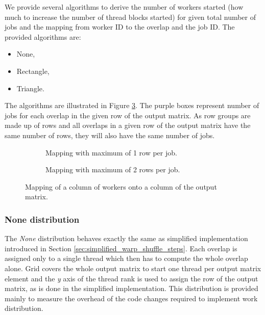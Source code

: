 We provide several algorithms to derive the number of workers started (how much to increase the number of thread blocks started) for given total number of jobs and the mapping from worker ID to the overlap and the job ID. The provided algorithms are:

\begin{itemize}
	\item None,
	\item Rectangle,
	\item Triangle.
\end{itemize}


The algorithms are illustrated in Figure \ref{fig:work_distribution_examples}. The purple boxes represent number of jobs for each overlap in the given row of the output matrix. As row groups are made up of rows and all overlaps in a given row of the output matrix have the same number of rows, they will also have the same number of jobs.

\begin{figure}[ht]
	\centering	
	\begin{subfigure}{0.7\textwidth}
	\centering
		\def\svgwidth{\textwidth}
		\fontsize{6}{8}\selectfont
		
		\caption{Mapping with maximum of 1 row per job.}
		\label{fig:work_dist_max_1}
	\end{subfigure}
	\hfill
	\begin{subfigure}{0.6\textwidth}
 		\centering
		\def\svgwidth{\textwidth}
		\fontsize{6}{8}\selectfont
		
		\caption{Mapping with maximum of 2 rows per job.}
		\label{fig:work_dist_max_2}
	\end{subfigure}
	
	\caption{Mapping of a column of workers onto a column of the output matrix.}
	\label{fig:work_distribution_examples}
\end{figure}


\subsubsection{None distribution}		
The \textit{None} distribution behaves exactly the same as simplified implementation introduced in Section \ref{sec:simplified_warp_shuffle_steps}. Each overlap is assigned only to a single thread which then has to compute the whole overlap alone. Grid covers the whole output matrix to start one thread per output matrix element and the \textit{y} axis of the thread rank is used to assign the row of the output matrix, as is done in the simplified implementation. This distribution is provided mainly to measure the overhead of the code changes required to implement work distribution. 

